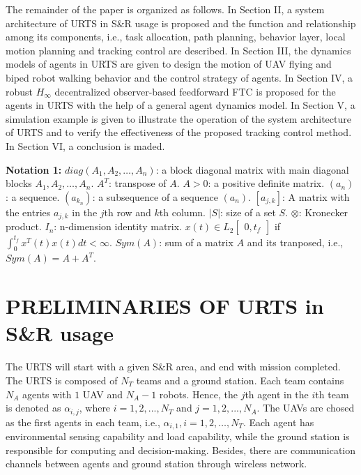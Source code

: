 \documentclass{ieeeaccess}
\begin{document}
The remainder of the paper is organized as follows. In Section II, a system architecture of URTS in S\&R usage is proposed and the function and relationship among its components, i.e., task allocation, path planning, behavior layer, local motion planning and tracking control are described. In Section III, the dynamics models of agents in URTS are given to design the motion of UAV flying and biped robot walking behavior and the control strategy of agents. In Section IV, a robust $H_\infty$ decentralized observer-based feedforward FTC is proposed for the agents in URTS with the help of a general agent dynamics model. In Section V, a simulation example is given to illustrate the operation of the system architecture of URTS and to verify the effectiveness of the proposed tracking control method. In Section VI, a conclusion is maded.

\textbf{Notation 1:} 
$diag(A_1, A_2, \dots, A_n)$: a block diagonal matrix with main diagonal blocks $A_1, A_2, \dots, A_n$. $A^T$: transpose of $A$. $A > 0$: a positive definite matrix. $(a_n)$: a sequence. $(a_{k_n})$: a subsequence of a sequence $(a_n)$. $[a_{j,k}]$: A matrix with the entries $a_{j,k}$ in the $j$th row and $k$th column. $\vert{S}\vert$: size of a set $S$. $\otimes$: Kronecker product. $I_n$: n-dimension identity matrix. $x(t)\in L_2\begin{bmatrix}
    0,t_f 
\end{bmatrix}$ if $\int^{t_f}_{0}x^T(t)x(t)dt<\infty$. $Sym(A)$: sum of a matrix $A$ and its tranposed, i.e., $Sym(A) = A+A^T$.

\section{PRELIMINARIES OF URTS in S\&R usage}
The URTS will start with a given S\&R area, and end with mission completed. The URTS is composed of $N_T$ teams and a ground station. Each team contains $N_A$ agents with $1$ UAV and $N_A-1$ robots. Hence, the $j$th agent in the $i$th team is denoted as $\alpha_{i,j}$, where $i=1,2,...,N_T$ and $j=1,2,...,N_A$. The UAVs are chosed as the first agents in each team, i.e., $\alpha_{i,1},i=1,2,\dots,N_T$. Each agent has environmental sensing capability and load capability, while the ground station is responsible for computing and decision-making. Besides, there are communication channels between agents and ground station through wireless network.
\end{document}
